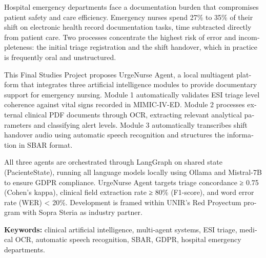\newpage
{}
\begin{otherlanguage}{english}
Hospital emergency departments face a documentation burden that compromises patient safety and care efficiency. Emergency nurses spend 27\% to 35\% of their shift on electronic health record documentation tasks, time subtracted directly from patient care. Two processes concentrate the highest risk of error and incompleteness: the initial triage registration and the shift handover, which in practice is frequently oral and unstructured.

This Final Studies Project proposes UrgeNurse Agent, a local multiagent platform that integrates three artificial intelligence modules to provide documentary support for emergency nursing. Module 1 automatically validates ESI triage level coherence against vital signs recorded in MIMIC-IV-ED. Module 2 processes external clinical PDF documents through OCR, extracting relevant analytical parameters and classifying alert levels. Module 3 automatically transcribes shift handover audio using automatic speech recognition and structures the information in SBAR format.

All three agents are orchestrated through LangGraph on shared state (PacienteState), running all language models locally using Ollama and Mistral-7B to ensure GDPR compliance. UrgeNurse Agent targets triage concordance ≥ 0.75 (Cohen's kappa), clinical field extraction rate ≥ 80\% (F1-score), and word error rate (WER) < 20\%. Development is framed within UNIR's Red Proyectum program with Sopra Steria as industry partner.


\vspace{2em}

\textbf{Keywords:} clinical artificial intelligence, multi-agent systems, ESI triage, medical OCR, automatic speech recognition, SBAR, GDPR, hospital emergency departments.
\end{otherlanguage}
